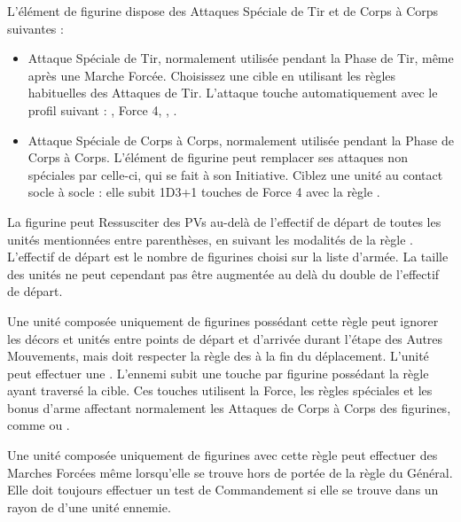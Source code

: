 \armyspecialruleentry{\wailofwoe}

L'élément de figurine dispose des Attaques Spéciale de Tir et de Corps à Corps suivantes :
\begin{itemize}[label={-}]
\item Attaque Spéciale de Tir, normalement utilisée pendant la Phase de Tir, même après une Marche Forcée. Choisissez une cible en utilisant les règles habituelles des Attaques de Tir. L'attaque touche automatiquement avec le profil suivant :\newline
{}, Force 4, \magicalattacks{}, .
\item Attaque Spéciale de Corps à Corps, normalement utilisée pendant la Phase de Corps à Corps. L'élément de figurine peut remplacer ses attaques non spéciales par celle-ci, qui se fait à son Initiative. Ciblez une unité au contact socle à socle : elle subit 1D3+1 touches de Force 4 avec la règle \magicalattacks{}.
\end{itemize}



La figurine peut Ressusciter des PVs au-delà de l'effectif de départ de toutes les unités mentionnées entre parenthèses, en suivant les modalités de la règle \raisewounds{}. L'effectif de départ est le nombre de figurines choisi sur la liste d'armée. La taille des unités ne peut cependant pas être augmentée au delà du double de l'effectif de départ.

\newpage
\armyspecialruleentry{\reaper}

Une unité composée uniquement de figurines possédant cette règle peut ignorer les décors et unités entre points de départ et d'arrivée durant l'étape des Autres Mouvements, mais doit respecter la règle des  à la fin du déplacement. L'unité peut effectuer une \sweepingattack{}. L'ennemi subit une touche par figurine possédant la règle \reaper{} ayant traversé la cible. Ces touches utilisent la Force, les règles spéciales et les bonus d'arme affectant normalement les Attaques de Corps à Corps des figurines, comme \flamingattacks{} ou \armourpiercing{}.


Une unité composée uniquement de figurines avec cette règle peut effectuer des Marches Forcées même lorsqu'elle se trouve hors de portée de la règle \inspiringpresence{} du Général. Elle doit toujours effectuer un test de Commandement si elle se trouve dans un rayon de  d'une unité ennemie.

